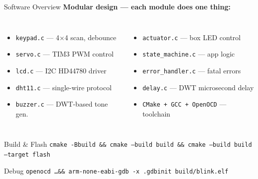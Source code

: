 \documentclass[10pt]{beamer}
\begin{document}
\begin{frame}[fragile]{Software Overview}
    \textbf{Modular design --- each module does one thing:}

    \medskip
    \begin{columns}[t]
        \begin{itemize}
            \item \texttt{keypad.c} --- 4$\times$4 scan, debounce
            \item \texttt{servo.c} --- TIM3 PWM control
            \item \texttt{lcd.c} --- I2C HD44780 driver
            \item \texttt{dht11.c} --- single-wire protocol
            \item \texttt{buzzer.c} --- DWT-based tone gen.
        \end{itemize}

        \begin{itemize}
            \item \texttt{actuator.c} --- box LED control
            \item \texttt{state\_machine.c} --- app logic
            \item \texttt{error\_handler.c} --- fatal errors
            \item \texttt{delay.c} --- DWT microsecond delay
            \item \texttt{CMake + GCC + OpenOCD} --- toolchain
        \end{itemize}
    \end{columns}

    \vfill
    \begin{block}{Build \& Flash}
        \texttt{cmake -Bbuild \&\& cmake --build build \&\& cmake --build build --target flash}
    \end{block}

    \begin{block}{Debug}
        \texttt{openocd \ldots \&\& arm-none-eabi-gdb -x .gdbinit build/blink.elf}
    \end{block}
\end{frame}
\end{document}

